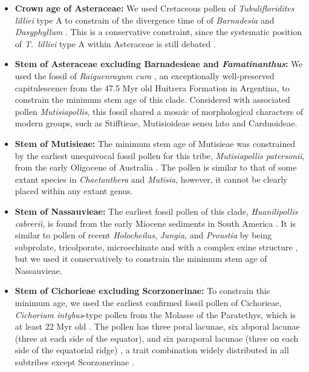 \documentclass[10pt]{article}
\begin{document}
\begin{itemize}

\item \textbf{Crown age of Asteraceae:} We used Cretaceous pollen of
  \textit{Tubulifloridites lilliei} type A to constrain of the
  divergence time of of \textit{Barnadesia} and \textit{Dasyphyllum}
  \cite{Barreda2015}. This is a conservative constraint, since the
  systematic position of \textit{T.~lilliei} type A within Asteraceae
  is still debated \citep{Barreda2015,Panero2015}.

\item \textbf{Stem of Asteraceae excluding Barnadesieae and
    \textit{Famatinanthus}:} We used the fossil of
  \textit{Raiguenrayum cura} \citep{Barreda2010,Barreda2012}, an
  exceptionally well-preserved capitulescence from the 47.5 Myr old
  Huitrera Formation in Argentina, to constrain the minimum stem age
  of this clade. Considered with associated pollen
  \textit{Mutisiapollis}, this fossil shared a mosaic of morphological
  characters of modern groups, such as Stifftieae, Mutisioideae sensu
  lato and Carduoideae.

\item \textbf{Stem of Mutisieae:} The minimum stem age of Mutisieae
  was constrained by the earliest unequivocal fossil pollen for this
  tribe, \textit{Mutisiapollis patersonii}, from the early Oligocene
  of Australia \citep{Macphail1994}. The pollen is similar to that of
  some extant species in \textit{Chaetanthera} and \textit{Mutisia},
  however, it cannot be clearly placed within any extant genus.

\item \textbf{Stem of Nassauvieae:} The earliest fossil pollen of this
  clade, \textit{Huanilipollis cabrerii}, is found from the early
  Miocene sediments in South America
  \citep{Barreda2008,Barreda2010}. It is similar to pollen of recent
  \textit{Holocheilus}, \textit{Jungia}, and \textit{Proustia} by
  being subprolate, tricolporate, microechinate and with a complex
  exine structure \citep{Barreda2008}, but we used it conservatively
  to constrain the minimum stem age of Nassauvieae.

\item \textbf{Stem of Cichorieae excluding Scorzonerinae:} To
  constrain this minimum age, we used the earliest confirmed fossil
  pollen of Cichorieae, \textit{Cichorium intybus}-type pollen from
  the Molasse of the Paratethys, which is at least 22 Myr old
  \citep{Hochuli1978}. The pollen has three poral lacunae, six abporal
  lacunae (three at each side of the equator), and six paraporal
  lacunae (three on each side of the equatorial ridge)
  \citep{Blackmore1984}, a trait combination widely distributed in all
  subtribes except Scorzonerinae \citep{Tremetsberger2013}.


\end{itemize}
\end{document}
